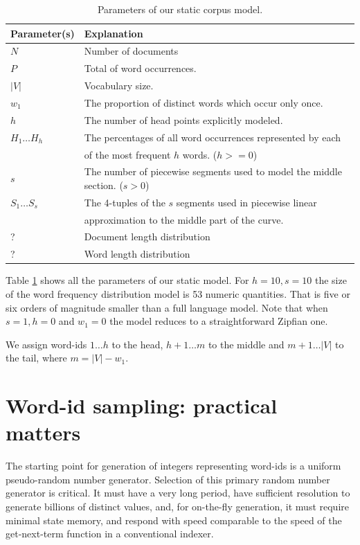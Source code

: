 \documentclass[11pt]{report}
\begin{document}
\begin{table} \centering
\caption{Parameters of our static corpus model. \label{statmodparams}
}
\begin{tabular}{ll}
Parameter(s) & Explanation\\
\hline
$N$&Number of documents\\
$P$&Total of word occurrences.\\
$|V|$&Vocabulary size.\\
$w_1$&The proportion of distinct words which occur only once.\\
$h$&The number of head points explicitly modeled.\\
$H_1\ldots H_{h}$&The percentages of all word occurrences represented by each\\
& of the most frequent $h$ words. ($h>=0$)\\
$s$&The number of piecewise segments used to model the middle
section. ($s>0$)\\
$S_1\ldots S_s$& The 4-tuples of the $s$ segments used in piecewise linear\\
&approximation to the middle part of the curve.\\
?& Document length distribution\\
?& Word length distribution\\
\hline
\end{tabular}
\end{table}

Table \ref{statmodparams} shows all the parameters of our static
model.  For $h=10, s=10$ the size of the word frequency distribution model is
53 numeric quantities. That is five or six orders of magnitude
smaller than a full language model.  Note that when $s=1, h=0$ and
$w_1=0$ the model reduces
to a straightforward Zipfian one.

We assign word-ids $1\ldots h$ to the head, $h+1 \ldots m$ to the
middle and $m+1 \ldots |V|$ to the tail, where $m = |V| - w_1$. 


\section{Word-id sampling: practical matters}

The starting point for generation of integers representing word-ids is
a uniform pseudo-random number generator.  Selection of this primary
random number generator is critical.  It must have a very long period,
have sufficient resolution to generate billions of distinct values,
and, for on-the-fly generation, it must require minimal state memory, and
respond with speed comparable to the speed of the get-next-term
function in a conventional indexer.
\end{document}
